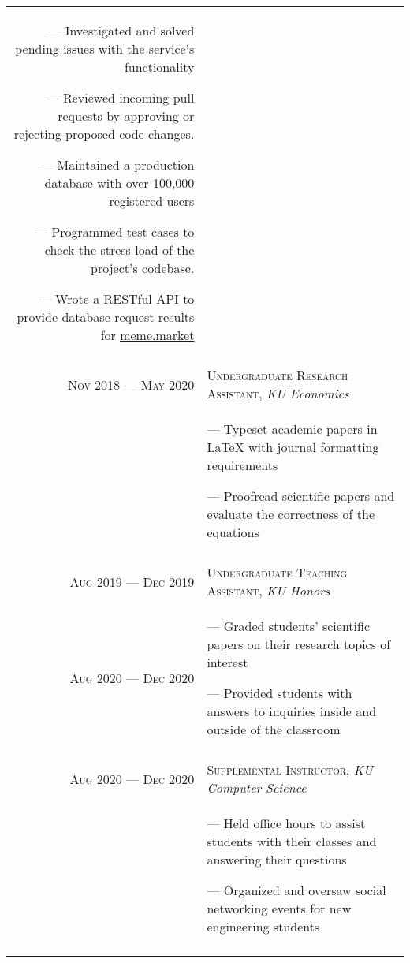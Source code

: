 \documentclass[a4paper, 10pt]{article}
\begin{document}
\begin{tabular}{r|p{12cm}}
{		--- Investigated and solved pending issues with the service's functionality

		--- Reviewed incoming pull requests by approving or rejecting proposed code changes.

		--- Maintained a production database with over 100,000 registered users

		--- Programmed test cases to check the stress load of the project's codebase.

		--- Wrote a RESTful API to provide database request results for \href{https://meme.market}{meme.market}
	}                                                                                                      \\\multicolumn{2}{c}{}\\

	\textsc{Nov 2018 --- May 2020} & \textsc{Undergraduate Research Assistant}, \emph{KU Economics}        \\&\footnotesize{
		--- Typeset academic papers in \LaTeX{} with journal formatting requirements

		--- Proofread scientific papers and evaluate the correctness of the equations
	}                                                                                                      \\\multicolumn{2}{c}{}\\

	\textsc{Aug 2019 --- Dec 2019} & \textsc{Undergraduate Teaching Assistant}, \emph{KU Honors}           \\ \textsc{Aug 2020 --- Dec 2020} &\footnotesize{
		--- Graded students' scientific papers on their research topics of interest

		--- Provided students with answers to inquiries inside and outside of the classroom
	}                                                                                                      \\\multicolumn{2}{c}{}\\


	\textsc{Aug 2020 --- Dec 2020} & \textsc{Supplemental Instructor}, \emph{KU Computer Science}          \\&\footnotesize{
		--- Held office hours to assist students with their classes and answering their questions

		--- Organized and oversaw social networking events for new engineering students
	}                                                                                                      \\\multicolumn{2}{c}{}\\


\end{tabular}
\end{document}
